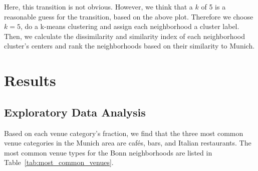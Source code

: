 \documentclass[UKenglish]{scrreprt}
\begin{document}
Here, this transition is not obvious. However, we think that a $k$ of 5 is a reasonable guess for the transition, based on the above plot. Therefore we choose $k=5$, do a k-means clustering and assign each neighborhood a cluster label. Then, we calculate the dissimilarity and similarity index of each neighborhood cluster's centers and rank the neighborhoods based on their similarity to Munich.

\chapter{Results}
\label{sec:Results}

\section{Exploratory Data Analysis}
Based on each venue category's fraction, we find that the three most common venue categories in the Munich area are cafés, bars, and Italian restaurants. The most common venue types for the Bonn neighborhoods are listed in Table~\ref{tab:most_common_venues}.
\end{document}
